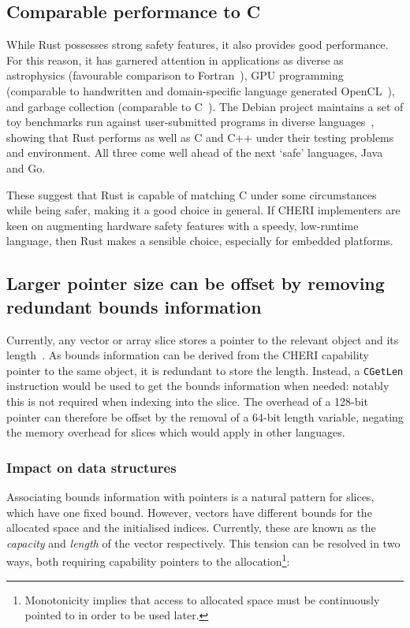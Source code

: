 \documentclass[dissertation.tex]{subfiles}
\begin{document}
\subsection{Comparable performance to C}
\label{sec:eval-cheri-perf}

While Rust possesses strong safety features, it also provides good
performance.
For this reason, it has garnered attention in applications as diverse as
astrophysics (favourable comparison to Fortran~\cite{blanco-astro}), GPU
programming (comparable to handwritten and domain-specific language
generated OpenCL~\cite{holk-gpu}), and garbage collection (comparable to
C~\cite{lin-gc}).
The Debian project maintains a set of toy benchmarks run against
user-submitted programs in diverse
languages~\cite{debian-benchmarksgame}, showing that Rust performs as
well as C and C++ under their testing problems and environment.
All three come well ahead of the next `safe' languages, Java and Go.

These suggest that Rust is capable of matching C under some
circumstances while being safer, making it a good choice in general.
If CHERI implementers are keen on augmenting hardware safety features
with a speedy, low-runtime language, then Rust makes a sensible choice,
especially for embedded platforms.


\subsection{Larger pointer size can be offset by removing redundant bounds information}
\label{sec:eval-cheri-memfoot}

Currently, any vector or array slice stores a pointer to the relevant
object and its length~\cite{blandy-orendorff}.
As bounds information can be derived from the CHERI capability pointer
to the same object, it is redundant to store the length.
Instead, a \texttt{CGetLen} instruction would be used to get the bounds
information when needed: notably this is not required when indexing into
the slice.
The overhead of a 128-bit pointer can therefore be offset by the removal
of a 64-bit length variable, negating the memory overhead for slices
which would apply in other languages.

\subsubsection{Impact on data structures}
Associating bounds information with pointers is a natural pattern for
slices, which have one fixed bound.
However, vectors have different bounds for the allocated space and the
initialised indices.
Currently, these are known as the \emph{capacity} and \emph{length} of
the vector respectively.
This tension can be resolved in two ways, both requiring capability
pointers to the allocation\footnote{
Monotonicity implies that access to allocated space must be continuously
pointed to in order to be used later.
}:
\end{document}
